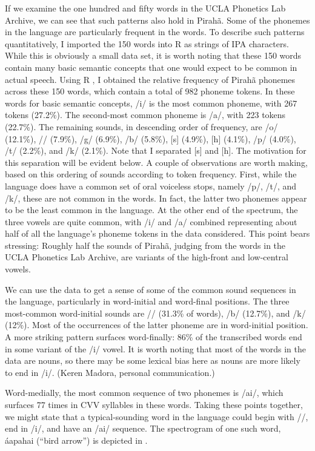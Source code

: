 \documentclass[output=paper,colorlinks,citecolor=brown
]{langscibook}
\begin{document}
    If we examine the one hundred and fifty words in the UCLA Phonetics Lab Archive, we can see that such patterns also hold in Pirahã. Some of the phonemes in the language are particularly frequent in the words. To describe such patterns quantitatively, I imported the 150 words into R as strings of IPA characters. While this is obviously a small data set, it is worth noting that these 150 words contain many basic semantic concepts that one would expect to be common in actual speech. Using R \citep{venables2003r}, I obtained the relative frequency of Pirahã phonemes across these 150 words, which contain a total of 982 phoneme tokens. In these words for basic semantic concepts, /i/ is the most common phoneme, with 267 tokens (27.2\%). The second-most common phoneme is /a/, with 223 tokens (22.7\%). The remaining sounds, in descending order of frequency, are /o/ (12.1\%), /{\textglotstop}/ (7.9\%), /g/ (6.9\%), /b/ (5.8\%), [s] (4.9\%), [h] (4.1\%), /p/ (4.0\%), /t/ (2.2\%), and /k/ (2.1\%). Note that I separated [s] and [h]. The motivation for this separation will be evident below. A couple of observations are worth making, based on this ordering of sounds according to token frequency. First, while the language does have a common set of oral voiceless stops, namely /p/, /t/, and /k/, these are not common in the words. In fact, the latter two phonemes appear to be the least common in the language. At the other end of the spectrum, the three vowels are quite common, with /i/ and /a/ combined representing about half of all the language’s phoneme tokens in the data considered. This point bears stressing: Roughly half the sounds of Pirahã, judging from the words in the UCLA Phonetics Lab Archive, are variants of the high-front and low-central vowels.

    We can use the data to get a sense of some of the common sound sequences in the language, particularly in word-initial and word-final positions. The three most-common word-initial sounds are /{\textglotstop}/ (31.3\% of words), /b/ (12.7\%), and /k/ (12\%). Most of the occurrences of the latter phoneme are in word-initial position. A more striking pattern surfaces word-finally: 86\% of the transcribed words end in some variant of the /i/ vowel. It is worth noting that most of the words in the data are nouns, so there may be some lexical bias here as nouns are more likely to end in /i/. (Keren Madora, personal communication.)

    Word-medially, the most common sequence of two phonemes is /ai/, which surfaces 77 times in CVV syllables in these words. Taking these points together, we might state that a typical-sounding word in the language could begin with /{\textglotstop}/, end in /i/, and have an /ai/ sequence. The spectrogram of one such word, {\textglotstop}áapahai (“bird arrow”) is depicted in .
\end{document}
